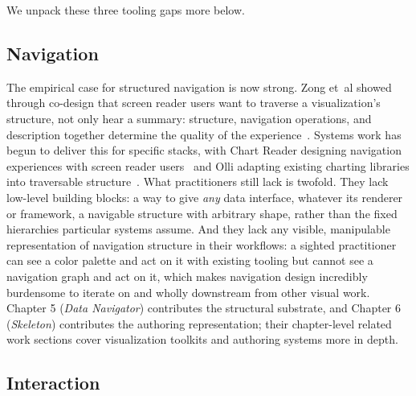 \documentclass[12pt]{cmuthesis}
\newcommand{\ea}{{et~al\xperiod}\xspace}
\begin{document}

We unpack these three tooling gaps more below.
 
\subsection{Navigation}
 
The empirical case for structured navigation is now strong. Zong \ea showed through co-design that screen reader users want to traverse a visualization's structure, not only hear a summary: structure, navigation operations, and description together determine the quality of the experience~\cite{Zong2022Rich}. Systems work has begun to deliver this for specific stacks, with Chart Reader designing navigation experiences with screen reader users~\cite{Thompson2023Chart} and Olli adapting existing charting libraries into traversable structure~\cite{Blanco2022olli}. What practitioners still lack is twofold. They lack low-level building blocks: a way to give \textit{any} data interface, whatever its renderer or framework, a navigable structure with arbitrary shape, rather than the fixed hierarchies particular systems assume. And they lack any visible, manipulable representation of navigation structure in their workflows: a sighted practitioner can see a color palette and act on it with existing tooling but cannot see a navigation graph and act on it, which makes navigation design incredibly burdensome to iterate on and wholly downstream from other visual work. Chapter 5 (\textit{Data Navigator}) contributes the structural substrate, and Chapter 6 (\textit{Skeleton}) contributes the authoring representation; their chapter-level related work sections cover visualization toolkits and authoring systems more in depth.
 
\subsection{Interaction}
 
\end{document}
